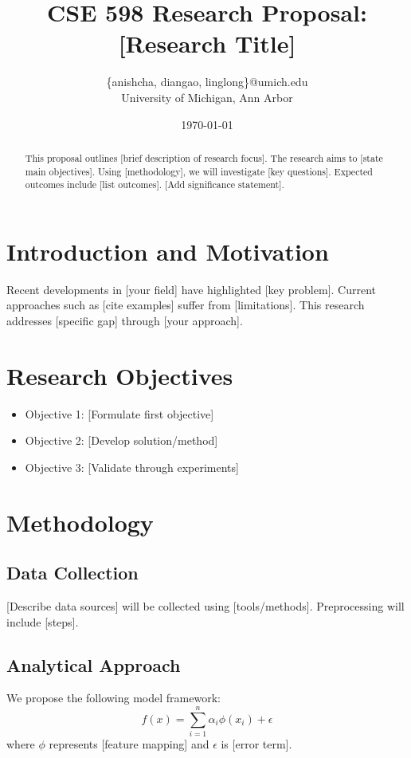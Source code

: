 \documentclass[12pt]{article}
\title{CSE 598 Research Proposal: [Research Title]}
\author{\{anishcha, diangao, linglong\}@umich.edu \\ University of Michigan, Ann Arbor}
\date{\today}
\begin{document}
\maketitle

\begin{abstract}
\noindent This proposal outlines [brief description of research focus]. The research aims to [state main objectives]. Using [methodology], we will investigate [key questions]. Expected outcomes include [list outcomes]. [Add significance statement].
\end{abstract}

\section{Introduction and Motivation}
Recent developments in [your field] have highlighted [key problem]. Current approaches such as [cite examples] suffer from [limitations]. This research addresses [specific gap] through [your approach].

\section{Research Objectives}
\begin{itemize}
    \item Objective 1: [Formulate first objective]
    \item Objective 2: [Develop solution/method]
    \item Objective 3: [Validate through experiments]
\end{itemize}

\section{Methodology}
\subsection{Data Collection}
[Describe data sources] will be collected using [tools/methods]. Preprocessing will include [steps].

\subsection{Analytical Approach}
We propose the following model framework:
\begin{equation}
    f(x) = \sum_{i=1}^n \alpha_i \phi(x_i) + \epsilon
\end{equation}
where $\phi$ represents [feature mapping] and $\epsilon$ is [error term].
\end{document}
